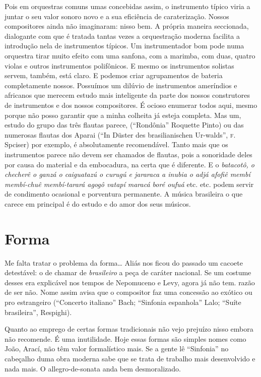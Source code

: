 Pois em orquestras comuns umas concebidas assim, o instrumento típico
viria a juntar o seu valor sonoro novo e a sua eficiência de
caraterização. Nossos compositores ainda não imaginaram: nisso bem. A
própria maneira seccionada, dialogante com que é tratada tantas vezes a
orquestração moderna facilita a introdução nela de instrumentos típicos.
Um instrumentador bom pode numa orquestra tirar muito efeito com uma
sanfona, com a marimba, com duas, quatro violas e outros instrumentos
polifônicos. E mesmo os instrumentos solistas servem, também, está
claro. E podemos criar agrupamentos de bateria completamente nossos.
Possuímos um dilúvio de instrumentos ameríndios e africanos que merecem
estudo mais inteligente da parte dos nossos construtores de instrumentos
e dos nossos compositores. É ocioso enumerar todos aqui, mesmo porque
não posso garantir que a minha colheita já esteja completa. Mas um,
estudo do grupo das três flautas parece, (``Rondônia'' Roquette Pinto) ou
das numerosas flautas dos Aparai (``In Düster des brasilianischen
Ur-walds'', \textsc{f}.\,Spciser) por exemplo, é absolutamente recomendável. Tanto
mais que os instrumentos parece não devem ser chamados de flautas, pois
a sonoridade deles por causa do material e da embocadura, na certa que é
diferente. E o \textit{batacotô, o checherê o ganzá o caiguatazú o curugú e
jararaca a inubia o adjá afofiê membí membí-chuê membí-tarará agogô
vatapí maracá boré oufuá} etc. etc. podem servir de condimento ocasional
e porventura permanente. A música brasileira o que carece em principal é
do estudo e do amor dos seus músicos.

\section{Forma}

Me falta tratar o problema da forma\ldots{} Aliás nos ficou do passado um
cacoete detestável: o de chamar de \textit{brasileiro} a peça de caráter
nacional. Se um costume desses era explicável nos tempos de Nepomuceno e
Levy, agora já não tem. razão de ser não. Nome assim avisa que o
compositor faz uma concessão ao exótico ou pro estrangeiro (``Concerto
italiano'' Bach; ``Sinfonia espanhola'' Lalo; ``Suíte brasileira'',
Respighi).

Quanto ao emprego de certas formas tradicionais não vejo prejuízo nisso
embora não recomende. É uma inutilidade. Hoje essas formas são simples
nomes como João, Arací, não têm valor formalístico mais. Se a gente lê
``Sinfonia'' no cabeçalho duma obra moderna sabe que se trata de trabalho
mais desenvolvido e nada mais. O allegro-de-sonata anda bem
desmoralizado.

